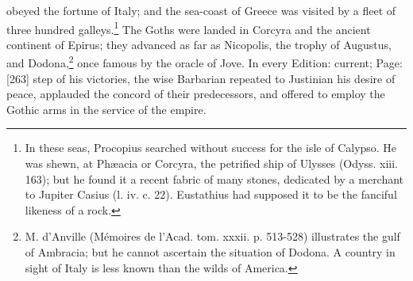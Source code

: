 obeyed the fortune of Italy; and the sea-coast of Greece was visited by a fleet of three hundred galleys.\footnote{In these seas, Procopius searched without success for the isle of Calypso. He was shewn, at Phæacia or Corcyra, the petrified ship of Ulysses (Odyss. xiii. 163); but he found it a recent fabric of many stones, dedicated by a merchant to Jupiter Casius (l. iv. c. 22). Eustathius had supposed it to be the fanciful likeness of a rock.} The Goths were landed in Corcyra and the ancient continent of Epirus; they advanced as far as Nicopolis, the trophy of Augustus, and Dodona,\footnote{M. d\texthebrew{}’Anville (Mémoires de l\texthebrew{}’Acad. tom. xxxii. p. 513-528) illustrates the gulf of Ambracia; but he cannot ascertain the situation of Dodona. A country in sight of Italy is less known than the wilds of America.} once famous by the oracle of Jove. In every Edition: current; Page: [263] step of his victories, the wise Barbarian repeated to Justinian his desire of peace, applauded the concord of their predecessors, and offered to employ the Gothic arms in the service of the empire.

